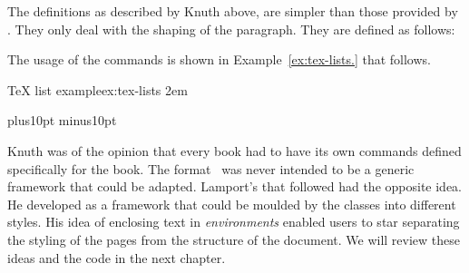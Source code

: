 The definitions as described by Knuth above, are simpler than those provided by \latexe. They only deal
with the shaping of the paragraph. They are defined as follows:

\begin{teXXX}
\def\hang{\hangindent\parindent}
\def\item{\par\hang\textindent}
\def\itemitem{\par\indent \hangindent2\parindent \textindent}
\def\textindent#1{\indent\llap{#1\enspace}\ignorespaces}
\def\narrower{\advance\leftskip by\parindent
  \advance\rightskip by\parindent}
\end{teXXX}

The usage of the commands is shown in Example~\ref{ex:tex-lists.} that follows. 

\begin{texexample}{TeX list example}{ex:tex-lists}
\bgroup
\parindent2em
\def\hang{\hangindent\parindent}
\def\item{\par\hang\textindent}
\def\itemitem{\par\indent \hangindent2\parindent \textindent}
\def\textindent#1{\indent\llap{#1\enspace}\ignorespaces}
\def\narrower{\advance\leftskip by\parindent
\advance\rightskip by\parindent}

\item{1} \lorem
\itemitem{2} \lorem
\egroup
\end{texexample}
\vskip0pt plus10pt minus10pt

Knuth was of the opinion that every book had to have its own commands defined specifically for the book. The format
\PlainTeX\ was never intended to be a generic framework that could be adapted. Lamport's \latexe that followed had the opposite idea. He developed \latex as a framework that could be moulded by the classes into different styles. His idea of enclosing
text in \emph{environments} enabled users to star separating the styling of the pages from the structure of the document.
We will review these ideas and the code in the next chapter.


\vfill





